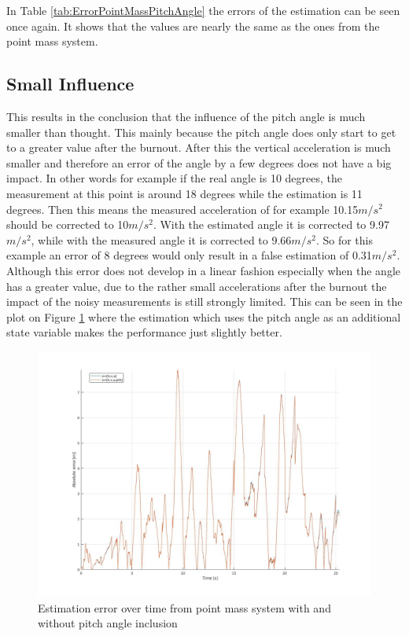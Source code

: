 In Table \ref{tab:ErrorPointMassPitchAngle} the errors of the estimation can be seen once again.
It shows that the values are nearly the same as the ones from the point mass system.

\newpage
\subsection{Small Influence}
This results in the conclusion that the influence of the pitch angle is much smaller than thought.
This mainly because the pitch angle does only start to get to a greater value after the burnout.
After this the vertical acceleration is much smaller and therefore an error of the angle by a few degrees does not have a big impact.
In other words for example if the real angle is 10 degrees, the measurement at this point is around 18 degrees while the estimation is 11 degrees.
Then this means the measured acceleration of for example 10.15$m/s^2$ should be corrected to 10$m/s^2$. With the estimated angle it is corrected to 9.97$m/s^2$,
while with the measured angle it is corrected to 9.66$m/s^2$. So for this example an error of 8 degrees would only result in a false estimation of 0.31$m/s^2$.
Although this error does not develop in a linear fashion especially when the angle has a greater value, due to the rather small accelerations after the burnout the impact of the noisy measurements is still strongly limited.
This can be seen in the plot on Figure \ref{fig:PointMassVSPitch} where the estimation which uses the pitch angle as an additional state variable makes the performance just slightly better.
\begin{figure}[h!]
 \centering
 \includegraphics[width=.8 \textwidth]{./Pictures/PointMassVSPitch.jpg}
 \caption{Estimation error over time from point mass system with and without pitch angle inclusion}
 \label{fig:PointMassVSPitch}
\end{figure}

